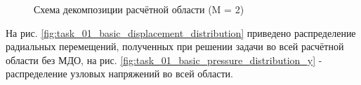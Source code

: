 \documentclass[a4paper]{article}
\begin{document}
\begin{figure}[h]
\caption{Схема декомпозиции расчётной области (M = 2)}
\label{fig:task_01_decomposition}
\end{figure}

\newpage

На рис. \ref{fig:task_01_basic_displacement_distribution} приведено распределение радиальных перемещений, полученных при решении задачи во всей расчётной области без МДО, на рис. \ref{fig:task_01_basic_pressure_distribution_y} - распределение узловых напряжений во всей области.
\end{document}
